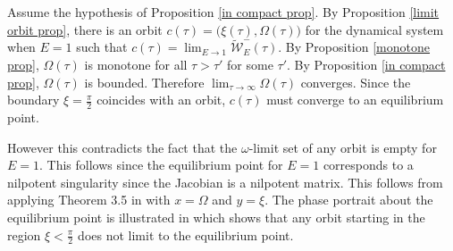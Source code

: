 \documentclass[11 pt]{article}
\renewcommand\({\left(}
\renewcommand\){\right)}
\newcommand\wt{\widetilde}
\newcommand\<{\langle}
\renewcommand\>{\rangle}
\newcommand\8{\infty}
\newcommand{\mc}{\mathcal}
\begin{document}
\medskip
\medskip


\medskip

Assume the hypothesis of Proposition \ref{in compact prop}. By Proposition \ref{limit orbit prop}, there is an orbit $c(\tau) = \big(\xi(\tau), \Omega(\tau)\big)$ for the dynamical system when $E = 1$ such that $c(\tau) = \lim_{E \to 1}\wt{\mc{W}}_E^-(\tau)$. By Proposition \ref{monotone prop}, $\Omega(\tau)$ is monotone for all $\tau> \tau'$ for some $\tau'$. By Proposition \ref{in compact prop}, $\Omega(\tau)$ is bounded. Therefore $\lim_{\tau \to \infty}\Omega(\tau)$ converges. Since the boundary $\xi = \frac{\pi}{2}$ coincides with an orbit, $c(\tau)$ must converge to an equilibrium point. 

However this contradicts the fact that the $\omega$-limit set of any orbit is empty for $E = 1$. This follows since the equilibrium point for $E = 1$ corresponds to a nilpotent singularity since the Jacobian is a nilpotent matrix. This follows from applying Theorem 3.5 in \cite{QTPDS} with $x = \Omega$ and $y = \xi$.  The phase portrait about the equilibrium point is illustrated in \cite[Fig. 3.21(i)]{QTPDS} which shows that any orbit starting in the region $\xi < \frac{\pi}{2}$ does not limit to the equilibrium point. 
\end{document}

